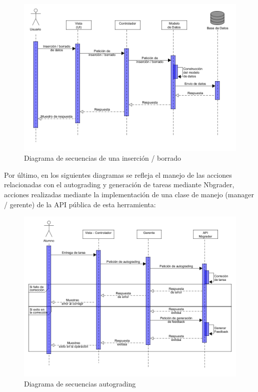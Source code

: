\begin{figure}[H]
    \hspace*{-1.5cm} 
    \includegraphics[scale=0.5]{img/imgs-memoria/Secuencias_Ins_DeL.png}
    \caption{Diagrama de secuencias de una inserción / borrado}
\end{figure}

Por último, en los siguientes diagramas se refleja el manejo de las acciones relacionadas con el autograding y generación de tareas mediante Nbgrader, acciones realizadas mediante la implementación de una clase de manejo (manager / gerente) de la API pública de esta herramienta:

\begin{figure}[H]
    \centering
    \includegraphics[width=\textwidth]{img/imgs-memoria/Secuencias_Autograding.png}
    \caption{Diagrama de secuencias autograding}
\end{figure}


